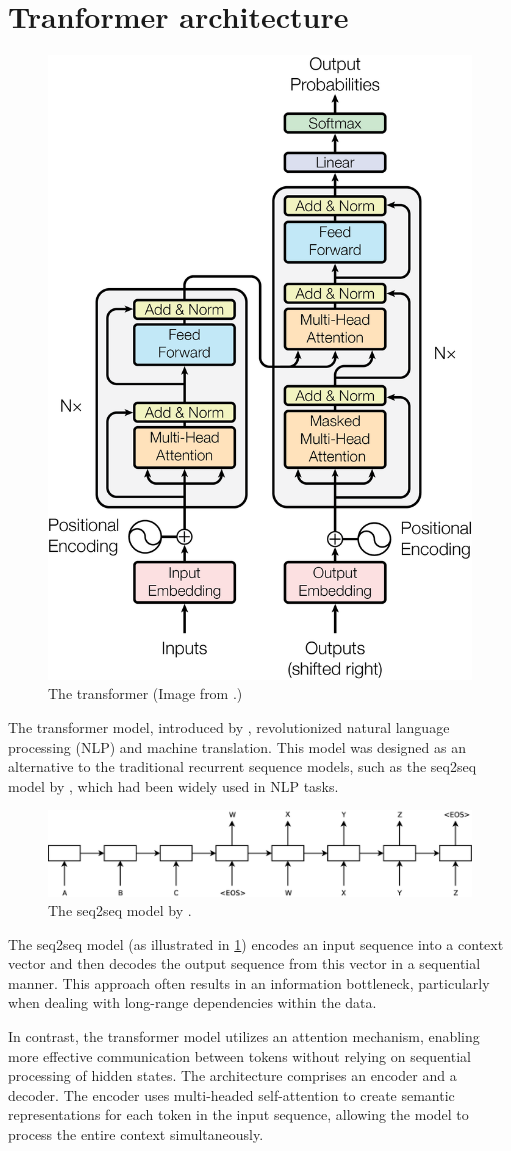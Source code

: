 % 



\section{Tranformer architecture}
\begin{figure}[H]
    \centering
    \includegraphics[width=0.4\linewidth]{figures/transformer.png}
    \caption{The transformer (Image from \cite{transformer2017}.)}
\end{figure}
The transformer model, introduced by \cite{transformer2017}, revolutionized natural language processing (NLP) and machine translation. This model was designed as an alternative to the traditional recurrent sequence models, such as the seq2seq model by \cite{seq2seq}, which had been widely used in NLP tasks.
\begin{figure}[H]
    \centering
    \includegraphics[width=0.8\linewidth]{figures/seq2seq.eps}
    \caption{The seq2seq model by \cite{seq2seq}.}
    \label{fig:seq2seq}
\end{figure}
The seq2seq model (as illustrated in \cref{fig:seq2seq}) encodes an input sequence into a context vector and then decodes the output sequence from this vector in a sequential manner. This approach often results in an information bottleneck, particularly when dealing with long-range dependencies within the data.

In contrast, the transformer model utilizes an attention mechanism, enabling more effective communication between tokens without relying on sequential processing of hidden states. The architecture comprises an encoder and a decoder. The encoder uses multi-headed self-attention to create semantic representations for each token in the input sequence, allowing the model to process the entire context simultaneously.


